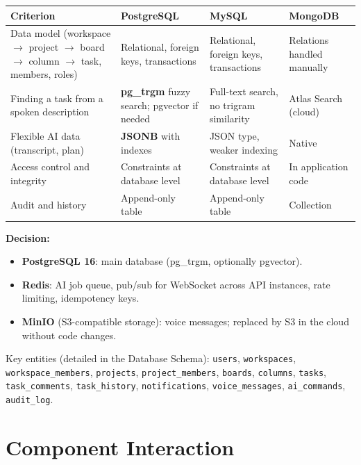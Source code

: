 \documentclass[11pt,a4paper]{article}
\newcommand{\tblstart}{\small\rowcolors{2}{gray!7}{white}}
\newcommand{\code}[1]{\texttt{#1}}
\begin{document}
{\tblstart
\begin{xltabular}{\textwidth}{P{4cm} L L L}
\toprule
\textbf{Criterion} & \textbf{PostgreSQL} & \textbf{MySQL} & \textbf{MongoDB} \\
\midrule
\endhead
Data model (workspace $\rightarrow$ project $\rightarrow$ board $\rightarrow$ column $\rightarrow$ task, members, roles) & Relational, foreign keys, transactions & Relational, foreign keys, transactions & Relations handled manually \\
Finding a task from a spoken description & \textbf{pg\_trgm} fuzzy search; pgvector if needed & Full-text search, no trigram similarity & Atlas Search (cloud) \\
Flexible AI data (transcript, plan) & \textbf{JSONB} with indexes & JSON type, weaker indexing & Native \\
Access control and integrity & Constraints at database level & Constraints at database level & In application code \\
Audit and history & Append-only table & Append-only table & Collection \\
\bottomrule
\end{xltabular}}

\textbf{Decision:}
\begin{itemize}
  \item \textbf{PostgreSQL 16}: main database (pg\_trgm, optionally pgvector).
  \item \textbf{Redis}: AI job queue, pub/sub for WebSocket across API instances, rate limiting, idempotency keys.
  \item \textbf{MinIO} (S3-compatible storage): voice messages; replaced by S3 in the cloud without code changes.
\end{itemize}

Key entities (detailed in the Database Schema): \code{users}, \code{workspaces}, \code{workspace\_members}, \code{projects}, \code{project\_members}, \code{boards}, \code{columns}, \code{tasks}, \code{task\_comments}, \code{task\_history}, \code{notifications}, \code{voice\_messages}, \code{ai\_commands}, \code{audit\_log}.

\section{Component Interaction}
\end{document}
